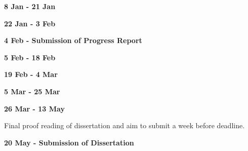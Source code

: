 
\textbf{8 Jan - 21 Jan}

\textbf{22 Jan - 3 Feb}

\textbf{4 Feb - Submission of Progress Report}

\textbf{5 Feb - 18 Feb}


\textbf{19 Feb - 4 Mar}


\textbf{5 Mar - 25 Mar}


\textbf{26 Mar - 13 May}

Final proof reading of dissertation and aim to submit a week before deadline.

\textbf{20 May - Submission of Dissertation}
